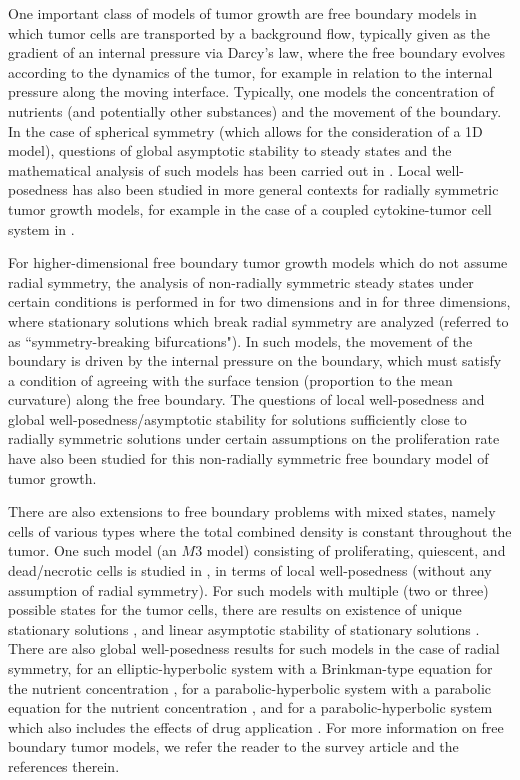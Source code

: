 \documentclass[12pt]{article}
\theoremstyle{plain}
\begin{document}
One important class of models of tumor growth are free boundary models in which tumor cells are transported by a background flow, typically given as the gradient of an internal pressure via Darcy's law, where the free boundary evolves according to the dynamics of the tumor, for example in relation to the internal pressure along the moving interface. Typically, one models the concentration of nutrients (and potentially other substances) and the movement of the boundary. In the case of spherical symmetry (which allows for the consideration of a 1D model), questions of global asymptotic stability to steady states and the mathematical analysis of such models has been carried out in \cite{Friedman1D_3, Friedman1D_2, Friedman1D_1}. Local well-posedness has also been studied in more general contexts for radially symmetric tumor growth models, for example in the case of a coupled cytokine-tumor cell system in \cite{CytokineChenFriedman}.

For higher-dimensional free boundary tumor growth models which do not assume radial symmetry, the analysis of non-radially symmetric steady states under certain conditions is performed in \cite{FriedmanBifurcation2, FriedmanBifurcation} for two dimensions and in \cite{FriedmanBifurcation3D} for three dimensions, where stationary solutions which break radial symmetry are analyzed (referred to as ``symmetry-breaking bifurcations"). In such models, the movement of the boundary is driven by the internal pressure on the boundary, which must satisfy a condition of agreeing with the surface tension (proportion to the mean curvature) along the free boundary. The questions of local well-posedness \cite{BazilyFriedman1} and global well-posedness/asymptotic stability for solutions sufficiently close to radially symmetric solutions under certain assumptions on the proliferation rate \cite{BazilyFriedman2} have also been studied for this non-radially symmetric free boundary model of tumor growth.

There are also extensions to free boundary problems with mixed states, namely cells of various types where the total combined density is constant throughout the tumor. One such model (an $M3$ model) consisting of proliferating, quiescent, and dead/necrotic cells is studied in \cite{ChenFriedmanM3}, in terms of local well-posedness (without any assumption of radial symmetry). For such models with multiple (two or three) possible states for the tumor cells, there are results on existence of unique stationary solutions \cite{CuiFriedmanM3}, and linear asymptotic stability of stationary solutions \cite{ChenCuiFriedman}. There are also global well-posedness results for such models in the case of radial symmetry, for an elliptic-hyperbolic system with a Brinkman-type equation for the nutrient concentration \cite{CuiFriedmanGlobal}, for a parabolic-hyperbolic system with a parabolic equation for the nutrient concentration \cite{CuiWei}, and for a parabolic-hyperbolic system which also includes the effects of drug application \cite{Zhao}. For more information on free boundary tumor models, we refer the reader to the survey article \cite{FriedmanOverview} and the references therein.
\end{document}

